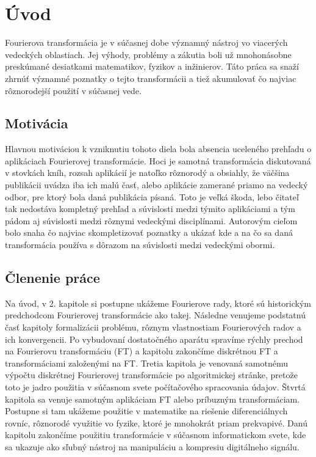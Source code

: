 \chapter{Úvod}

Fourierova transformácia je v súčasnej dobe významný nástroj vo
viacerých vedeckých oblastiach. Jej výhody, problémy a zákutia boli už
mnohonásobne preskúmané desiatkami matematikov, fyzikov a inžinierov.
Táto práca sa snaží zhrnúť významné poznatky o tejto transformácii a
tiež akumulovať čo najviac rôznorodejší použití v súčasnej vede.

\section{Motivácia}
Hlavnou motiváciou k vzniknutiu tohoto diela bola absencia uceleného
prehľadu o aplikáciach Fourierovej transformácie. Hoci je samotná
transformácia diskutovaná v stovkách kníh, rozsah aplikácií je natoľko
rôznorodý a obsiahly, že väčšina publikácii uvádza iba ich malú časť,
alebo aplikácie zamerané priamo na vedecký odbor, pre ktorý bola daná
publikácia písaná. Toto je veľká škoda, lebo čitateľ tak nedostáva
kompletný prehľad a súvislosti medzi týmito aplikáciami a tým
pádom aj súvislosti medzi rôznymi vedeckými disciplínami. Autorovým
cieľom bolo snaha čo najviac skompletizovať poznatky a ukázať kde a
na čo sa daná transformácia používa s dôrazom na súvislosti medzi
vedeckými obormi.

\section{Členenie práce}
Na úvod, v 2. kapitole si postupne ukážeme Fourierove rady, ktoré sú
historickým predchodcom Fourierovej transformácie ako takej. Následne
venujeme podstatnú časť kapitoly formalizácii problému, rôznym
vlastnostiam Fourierových radov a ich konvergencii. Po vybudovaní
dostatočného aparátu spravíme rýchly prechod na Fourierovu
transformáciu (FT) a kapitolu zakončíme diskrétnou FT a 
transformáciami založenými na FT.
Tretia kapitola je venovaná samotnému výpočtu diskrétnej Fourierovej
transformácie po algoritmickej stránke, pretože toto je jadro použitia
v súčasnom svete počítačového spracovania údajov.
Štvrtá kapitola sa venuje samotným aplikáciam FT alebo príbuzným
transformáciam. Postupne si tam ukážeme použitie v matematike na riešenie
diferenciálnych rovníc, rôznorodé využitie vo fyzike, ktoré je
mnohokrát priam prekvapivé. Danú kapitolu zakončíme použitiu
transformácie v súčasnom informatickom svete, kde sa ukazuje ako
sľubný nástroj na manipuláciu a kompresiu digitálneho signálu.
